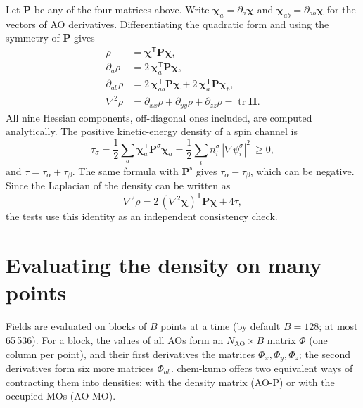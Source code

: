 \documentclass[11pt,a4paper]{article}
\begin{document}
Let $\mathbf P$ be any of the four matrices above. Write
$\boldsymbol\chi_a=\partial_a\boldsymbol\chi$ and
$\boldsymbol\chi_{ab}=\partial_{ab}\boldsymbol\chi$ for the vectors of AO
derivatives. Differentiating the quadratic form and using the symmetry of
$\mathbf P$ gives
\begin{align}
 \rho&=\boldsymbol\chi^{\mathsf T}\mathbf P\boldsymbol\chi,\\
 \partial_a\rho&=2\,\boldsymbol\chi_a^{\mathsf T}\mathbf P\boldsymbol\chi,\\
 \partial_{ab}\rho&=2\,\boldsymbol\chi_{ab}^{\mathsf T}\mathbf P\boldsymbol\chi
       +2\,\boldsymbol\chi_a^{\mathsf T}\mathbf P\boldsymbol\chi_b,\\
 \nabla^2\rho&=\partial_{xx}\rho+\partial_{yy}\rho+\partial_{zz}\rho
 =\operatorname{tr}\mathbf H .
\end{align}
All nine Hessian components, off-diagonal ones included, are computed
analytically. The positive kinetic-energy density of a spin channel is
\begin{equation}
 \tau_\sigma=\frac12\sum_{a}\boldsymbol\chi_a^{\mathsf T}\mathbf P^\sigma\boldsymbol\chi_a
 =\frac12\sum_i n_i^\sigma\,|\nabla\psi_i^\sigma|^2\ \ge0,
\end{equation}
and $\tau=\tau_\alpha+\tau_\beta$. The same formula with
$\mathbf P^{\mathrm s}$ gives $\tau_\alpha-\tau_\beta$, which can be
negative. Since the Laplacian of the density can be written as
\begin{equation}
 \nabla^2\rho=2\,(\nabla^2\boldsymbol\chi)^{\mathsf T}\mathbf P\boldsymbol\chi+4\tau,
\end{equation}
the tests use this identity as an independent consistency check.

\section{Evaluating the density on many points}\label{sec:contraction}

Fields are evaluated on blocks of $B$ points at a time (by default
$B=128$; at most 65\,536). For a block, the values of all AOs form an
$N_{\mathrm{AO}}\times B$ matrix $\Phi$ (one column per point), and their
first derivatives the matrices $\Phi_x,\Phi_y,\Phi_z$; the second
derivatives form six more matrices $\Phi_{ab}$. chem-kumo offers two
equivalent ways of contracting them into densities: with the density matrix
(AO-P) or with the occupied MOs (AO-MO).
\end{document}
